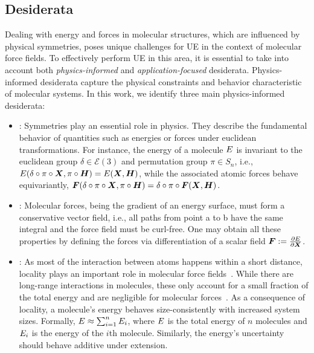 \subsection{Desiderata}\label{sec:desiderata}
Dealing with energy and forces in molecular structures, which are influenced by physical symmetries, poses unique challenges for UE in the context of molecular force fields. To effectively perform UE in this area, it is essential to take into account both \emph{physics-informed} and \emph{application-focused} desiderata. Physics-informed desiderata capture the physical constraints and behavior characteristic of molecular systems. In this work, we identify three main physics-informed desiderata:
\begin{itemize}
    \item \desone{}: Symmetries play an essential role in physics. They describe the fundamental behavior of quantities such as energies or forces under euclidean transformations. For instance, the energy of a molecule $E$ is invariant to the euclidean group $\delta\in\mathcal{E}(3)$ and permutation group $\pi\in S_n$, i.e., $E(\delta\circ\pi\circ\bm{X},\pi\circ\bm{H})=E(\bm{X},\bm{H})$, while the associated atomic forces behave equivariantly, $\bm{F}(\delta\circ\pi\circ\bm{X},\pi\circ\bm{H})=\delta\circ\pi\circ\bm{F}(\bm{X},\bm{H})$. 
    \item \destwo{}: Molecular forces, being the gradient of an energy surface, must form a conservative vector field, i.e., all paths from point a to b have the same integral and the force field must be curl-free.
    One may obtain all these properties by defining the forces via differentiation of a scalar field $\bm{F}:=\frac{\partial E}{\partial\bm{X}}$.
    \item \desfour{}: As most of the interaction between atoms happens within a short distance, locality plays an important role in molecular force fields~\citep{leachMolecularModellingPrinciples2001}. While there are long-range interactions in molecules, these only account for a small fraction of the total energy and are negligible for molecular forces~\citep{lanAdsorbMLAcceleratingAdsorption2023}.
    As a consequence of locality, a molecule's energy behaves size-consistently with increased system sizes.
    Formally, $E \approx \sum_{i=1}^n E_i$, where $E$ is the total energy of $n$ molecules and $E_i$ is the energy of the $i$th molecule. Similarly, the energy's uncertainty should behave additive under extension.
\end{itemize}
